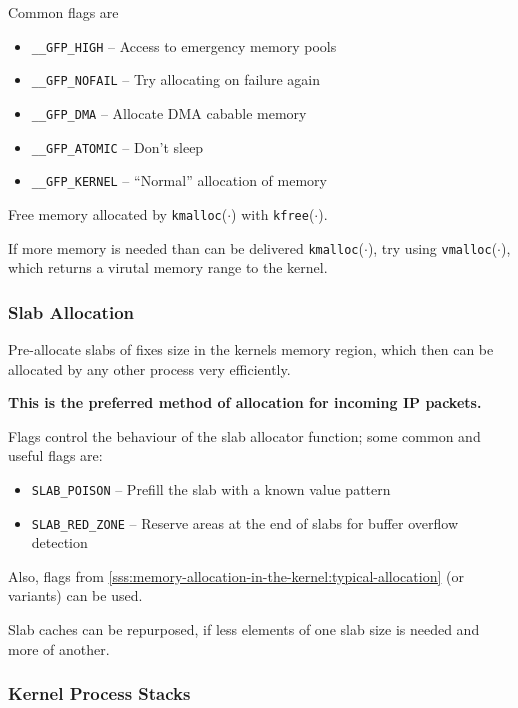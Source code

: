 \documentclass[english]{panikzettel}
\newcommand{\fkt}[1]{\texttt{#1}(\(\cdot\))}
\newcommand{\alert}[1]{\textbf{\textcolor{red!75!black}{#1}}}
\begin{document}
	Common flags are
	\begin{itemize}
		\item \texttt{\_\_GFP\_HIGH} – Access to emergency memory pools
		\item \texttt{\_\_GFP\_NOFAIL} – Try allocating on failure again 
		\item \texttt{\_\_GFP\_DMA} – Allocate DMA cabable memory 
		\item \texttt{\_\_GFP\_ATOMIC} – Don't sleep  
		\item \texttt{\_\_GFP\_KERNEL} – \enquote{Normal} allocation of memory
	\end{itemize}

	Free memory allocated by \fkt{kmalloc} with \fkt{kfree}.

	If more memory is needed than can be delivered \fkt{kmalloc}, try using \fkt{vmalloc}, which returns a virutal memory range to the kernel.  

	\subsubsection{Slab Allocation}
	\label{sss:memory-allocation-in-the-kernel:slab-allocation}
	
	Pre-allocate slabs of fixes size in the kernels memory region, which then can be allocated by any other process very efficiently.
	
	\alert{This is the preferred method of allocation for incoming IP packets.}

	Flags control the behaviour of the slab allocator function; some common and useful flags are:
	\begin{itemize}
		\item \texttt{SLAB\_POISON} – Prefill the slab with a known value pattern
		\item \texttt{SLAB\_RED\_ZONE} – Reserve areas at the end of slabs for buffer overflow detection
	\end{itemize}
	Also, flags from \cref{sss:memory-allocation-in-the-kernel:typical-allocation} (or variants) can be used. 
		
	Slab caches can be repurposed, if less elements of one slab size is needed and more of another.	

	\subsubsection{Kernel Process Stacks}
	\label{sss:memory-allocation-in-the-kernel:kernel-process-stacks}
	
\end{document}

